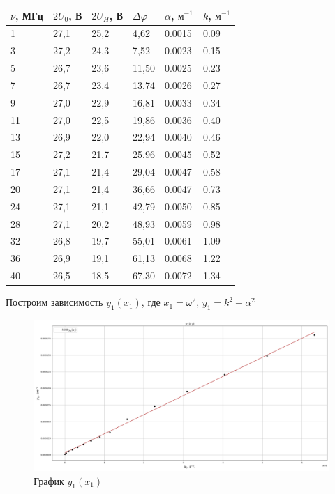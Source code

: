 \documentclass[a4paper,12pt]{article}
\theoremstyle{definition}
\begin{document}
	\begin{table}[h]
		\centering
		\begin{tabular}{|l|l|l|l|l|l|} \hline
			$\nu$, МГц 
					& $2U_{0}$, В 
						   & $2U_{H}$, В 
								  & $\Delta \varphi$ 
								  		  & $\alpha$, $\text{м}^{-1}$  
										           & $k$, $\text{м}^{-1}$ \\ \hline
			1       & 27,1 & 25,2 &  4,62 & 0.0015 & 0.09 \\ \hline
			3       & 27,2 & 24,3 &  7,52 & 0.0023 & 0.15 \\ \hline
			5       & 26,7 & 23,6 & 11,50 & 0.0025 & 0.23 \\ \hline
			7       & 26,7 & 23,4 & 13,74 & 0.0026 & 0.27 \\ \hline
			9       & 27,0 & 22,9 & 16,81 & 0.0033 & 0.34 \\ \hline
			11      & 27,0 & 22,5 & 19,86 & 0.0036 & 0.40 \\ \hline
			13      & 26,9 & 22,0 & 22,94 & 0.0040 & 0.46 \\ \hline
			15      & 27,2 & 21,7 & 25,96 & 0.0045 & 0.52 \\ \hline
			17      & 27,1 & 21,4 & 29,04 & 0.0047 & 0.58 \\ \hline
			20      & 27,1 & 21,4 & 36,66 & 0.0047 & 0.73 \\ \hline
			24      & 27,1 & 21,1 & 42,79 & 0.0050 & 0.85 \\ \hline
			28      & 27,1 & 20,2 & 48,93 & 0.0059 & 0.98 \\ \hline
			32      & 26,8 & 19,7 & 55,01 & 0.0061 & 1.09 \\ \hline
			36      & 26,9 & 19,1 & 61,13 & 0.0068 & 1.22 \\ \hline
			40      & 26,5 & 18,5 & 67,30 & 0.0072 & 1.34 \\ \hline
		\end{tabular}
	\end{table}
	Построим зависимость $y_1(x_1)$, где $x_1=\omega^2$, $y_1=k^2-\alpha^2$
	\newpage
	\begin{figure}[h]
		\centering
		\includegraphics[scale=0.38]{graph41.png}
		\caption{График $y_1(x_1)$}
	\end{figure}
\end{document}
